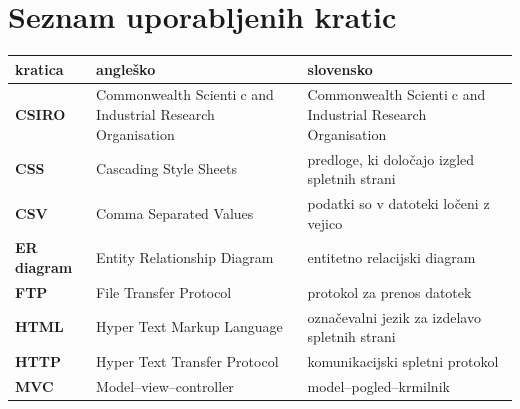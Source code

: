 \documentclass[a4paper, 12pt]{book}
\newcommand{\clearemptydoublepage}{\newpage{\pagestyle{empty}\cleardoublepage}}
\begin{document}
\clearemptydoublepage


\pagestyle{empty}
\def\thepage{}%
\tableofcontents{}


\clearemptydoublepage


\chapter*{Seznam uporabljenih kratic}  %
\noindent\begin{tabular}{p{}|p{}|p{}}    %
  {\bf kratica} & {\bf angleško}                             & {\bf slovensko} \\ \hline
  {\bf CSIRO} & Commonwealth Scientic and Industrial Research Organisation & Commonwealth Scientic and Industrial Research Organisation \\
  {\bf CSS} & Cascading Style Sheets & predloge, ki določajo izgled spletnih strani \\
  {\bf CSV} & Comma Separated Values & podatki so v datoteki ločeni z vejico \\
  {\bf ER diagram} & Entity Relationship Diagram & entitetno relacijski diagram \\
  {\bf FTP} & File Transfer Protocol & protokol za prenos datotek \\
  {\bf HTML} & Hyper Text Markup Language & označevalni jezik za izdelavo spletnih strani \\
  {\bf HTTP} & Hyper Text Transfer Protocol & komunikacijski spletni protokol \\
  {\bf MVC} & Model--view--controller & model--pogled--krmilnik \\

\end{tabular}
\end{document}
